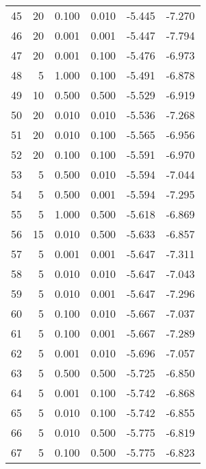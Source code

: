 \begin{tabular}{rrrrrr}
    45 &        20 &  0.100 & 0.010 &                 -5.445 &      -7.270 \\
    46 &        20 &  0.001 & 0.001 &                 -5.447 &      -7.794 \\
    47 &        20 &  0.001 & 0.100 &                 -5.476 &      -6.973 \\
    48 &         5 &  1.000 & 0.100 &                 -5.491 &      -6.878 \\
    49 &        10 &  0.500 & 0.500 &                 -5.529 &      -6.919 \\
    50 &        20 &  0.010 & 0.010 &                 -5.536 &      -7.268 \\
    51 &        20 &  0.010 & 0.100 &                 -5.565 &      -6.956 \\
    52 &        20 &  0.100 & 0.100 &                 -5.591 &      -6.970 \\
    53 &         5 &  0.500 & 0.010 &                 -5.594 &      -7.044 \\
    54 &         5 &  0.500 & 0.001 &                 -5.594 &      -7.295 \\
    55 &         5 &  1.000 & 0.500 &                 -5.618 &      -6.869 \\
    56 &        15 &  0.010 & 0.500 &                 -5.633 &      -6.857 \\
    57 &         5 &  0.001 & 0.001 &                 -5.647 &      -7.311 \\
    58 &         5 &  0.010 & 0.010 &                 -5.647 &      -7.043 \\
    59 &         5 &  0.010 & 0.001 &                 -5.647 &      -7.296 \\
    60 &         5 &  0.100 & 0.010 &                 -5.667 &      -7.037 \\
    61 &         5 &  0.100 & 0.001 &                 -5.667 &      -7.289 \\
    62 &         5 &  0.001 & 0.010 &                 -5.696 &      -7.057 \\
    63 &         5 &  0.500 & 0.500 &                 -5.725 &      -6.850 \\
    64 &         5 &  0.001 & 0.100 &                 -5.742 &      -6.868 \\
    65 &         5 &  0.010 & 0.100 &                 -5.742 &      -6.855 \\
    66 &         5 &  0.010 & 0.500 &                 -5.775 &      -6.819 \\
    67 &         5 &  0.100 & 0.500 &                 -5.775 &      -6.823 \\

\end{tabular}
